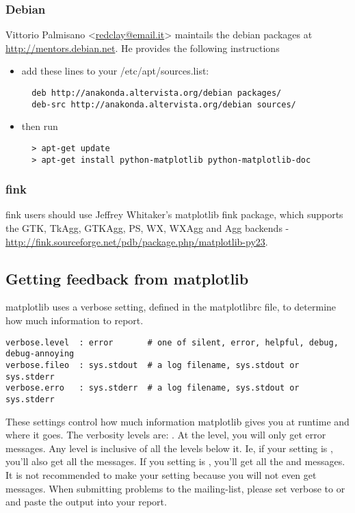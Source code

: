\documentclass[twoside]{book}
\begin{document}
\subsubsection{Debian}
\label{sec:debian}

Vittorio Palmisano <\url{redclay@email.it}> maintails the debian
packages at \url{http://mentors.debian.net}.  He provides the
following instructions

\begin{itemize}
\item       add these lines to your /etc/apt/sources.list:
\begin{verbatim}
  deb http://anakonda.altervista.org/debian packages/
  deb-src http://anakonda.altervista.org/debian sources/
\end{verbatim}

\item then run

\begin{verbatim}
  > apt-get update
  > apt-get install python-matplotlib python-matplotlib-doc
\end{verbatim}
\end{itemize}

\subsubsection{fink}
\label{sec:fink}

fink users should use Jeffrey Whitaker's matplotlib fink package,
which supports the GTK, TkAgg, GTKAgg, PS, WX, WXAgg and Agg backends
- \url{http://fink.sourceforge.net/pdb/package.php/matplotlib-py23}.

\subsection{Getting feedback from matplotlib}

matplotlib uses a verbose setting, defined in the matplotlibrc file,
to determine how much information to report. 

\begin{verbatim}
verbose.level  : error       # one of silent, error, helpful, debug, debug-annoying
verbose.fileo  : sys.stdout  # a log filename, sys.stdout or sys.stderr
verbose.erro   : sys.stderr  # a log filename, sys.stdout or sys.stderr

\end{verbatim}


\noindent These settings control how much information matplotlib gives you at
runtime and where it goes.  The verbosity levels are: .  At the  level,
you will only get error messages.  Any level is inclusive of all the
levels below it.  Ie, if your setting is , you'll also get
all the  messages.  If you setting is , you'll get
all the  and  messages.  It is not recommended
to make your setting  because you will not even get
 messages.  When submitting problems to the mailing-list,
please set verbose to  or  and paste the output
into your report.
\end{document}
